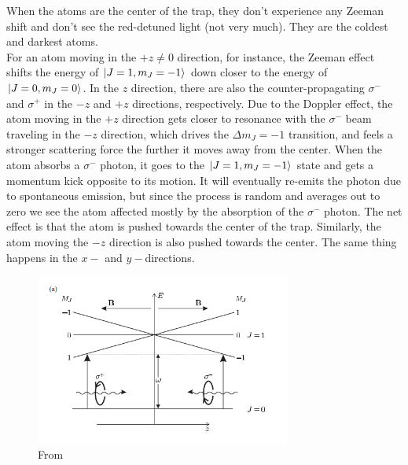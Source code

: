 \documentclass{book}
\theoremstyle{definition}
\begin{document}
When the atoms are the center of the trap, they don't experience any Zeeman shift and don't see the red-detuned light (not very much). They are the coldest and darkest atoms.\\


For an atom moving in the $+z \neq 0$ direction, for instance, the Zeeman effect shifts the energy of $\ket{J=1,m_J=-1}$ down closer to the energy of $\ket{J=0,m_J=0}$. In the $z$ direction, there are also the counter-propagating $\sigma^-$ and $\sigma^+$ in the $- z$ and $+z$ directions, respectively. Due to the Doppler effect, the atom moving in the $+z$ direction gets closer to resonance with the $\sigma^-$ beam traveling in the $-z$ direction, which drives the $\Delta m_J = -1$ transition, and feels a stronger scattering force the further it moves away from the center. When the atom absorbs a $\sigma^-$ photon, it goes to the $\ket{J=1,m_J=-1}$ state and gets a momentum kick opposite to its motion. It will eventually re-emits the photon due to spontaneous emission, but since the process is random and averages out to zero we see the atom affected mostly by the absorption of the $\sigma^-$ photon. The net effect is that the atom is pushed towards the center of the trap. Similarly, the atom moving the $-z$ direction is also pushed towards the center. The same thing happens in the $x-$ and $y-$directions.  
 	
 	
\begin{figure}[!htb]
	\centering
	\includegraphics[width=0.75\textwidth]{images/foot_1}
	\caption{From \cite{foot2005atomic}}
\end{figure}
\end{document}
